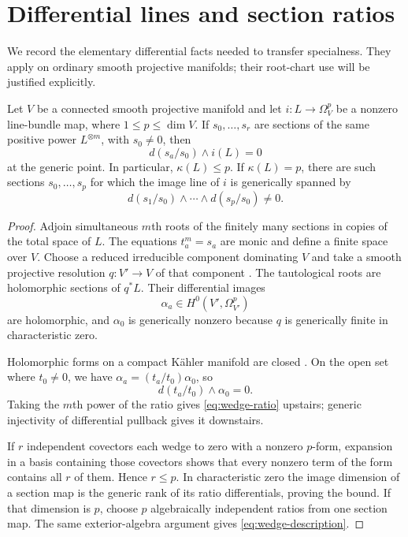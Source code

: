 \section{Differential lines and section ratios}

We record the elementary differential facts needed to transfer specialness. They apply on ordinary smooth projective manifolds; their root-chart use will be justified explicitly.

\begin{lemma}\label{lem:ratios}
Let $V$ be a connected smooth projective manifold and let $i:L\to\Omega_V^p$ be a nonzero line-bundle map, where $1\le p\le\dim V$. If $s_0,\ldots,s_r$ are sections of the same positive power $L^{\otimes m}$, with $s_0\ne0$, then
\begin{equation}\label{eq:wedge-ratio}
 d(s_a/s_0)\wedge i(L)=0
\end{equation}
at the generic point. In particular, $\kappa(L)\le p$. If $\kappa(L)=p$, there are such sections $s_0,\ldots,s_p$ for which the image line of $i$ is generically spanned by
\begin{equation}\label{eq:wedge-description}
 d(s_1/s_0)\wedge\cdots\wedge d(s_p/s_0)\ne0.
\end{equation}
\end{lemma}

\begin{proof}
Adjoin simultaneous $m$th roots of the finitely many sections in copies of the total space of $L$. The equations $t_a^m=s_a$ are monic and define a finite space over $V$. Choose a reduced irreducible component dominating $V$ and take a smooth projective resolution $q:V'\to V$ of that component \cite{Hironaka}. The tautological roots are holomorphic sections of $q^*L$. Their differential images
\[
 \alpha_a\in H^0(V',\Omega_{V'}^p)
\]
are holomorphic, and $\alpha_0$ is generically nonzero because $q$ is generically finite in characteristic zero.

Holomorphic forms on a compact K\"ahler manifold are closed \cite{Demailly}. On the open set where $t_0\ne0$, we have $\alpha_a=(t_a/t_0)\alpha_0$, so
\[
 d(t_a/t_0)\wedge\alpha_0=0.
\]
Taking the $m$th power of the ratio gives \eqref{eq:wedge-ratio} upstairs; generic injectivity of differential pullback gives it downstairs.

If $r$ independent covectors each wedge to zero with a nonzero $p$-form, expansion in a basis containing those covectors shows that every nonzero term of the form contains all $r$ of them. Hence $r\le p$. In characteristic zero the image dimension of a section map is the generic rank of its ratio differentials, proving the bound. If that dimension is $p$, choose $p$ algebraically independent ratios from one section map. The same exterior-algebra argument gives \eqref{eq:wedge-description}.
\end{proof}

